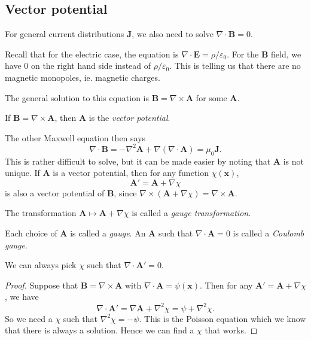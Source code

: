 \documentclass[a4paper]{article}
\begin{document}
\subsection{Vector potential}
For general current distributions $\mathbf{J}$, we also need to solve $\nabla \cdot \mathbf{B} = 0$.

Recall that for the electric case, the equation is $\nabla\cdot \mathbf{E} = \rho/\varepsilon_0$. For the $\mathbf{B}$ field, we have $0$ on the right hand side instead of $\rho/\varepsilon_0$. This is telling us that there are no magnetic monopoles, ie. magnetic charges.

The general solution to this equation is $\mathbf{B} = \nabla \times \mathbf{A}$ for some $\mathbf{A}$.
\begin{defi}
  If $\mathbf{B} = \nabla\times \mathbf{A}$, then $\mathbf{A}$ is the \emph{vector potential}.
\end{defi}
The other Maxwell equation then says
\[
  \nabla \cdot \mathbf{B} = -\nabla^2 \mathbf{A} + \nabla(\nabla\cdot \mathbf{A}) = \mu_0 \mathbf{J}.\tag{$*$}
\]
This is rather difficult to solve, but it can be made easier by noting that $\mathbf{A}$ is not unique. If $\mathbf{A}$ is a vector potential, then for any function $\chi(\mathbf{x})$,
\[
  \mathbf{A}' = \mathbf{A} + \nabla \chi
\]
is also a vector potential of $\mathbf{B}$, since $\nabla \times (\mathbf{A} + \nabla \chi) = \nabla \times \mathbf{A}$.

The transformation $\mathbf{A} \mapsto \mathbf{A} + \nabla\chi$ is called a \emph{gauge transformation}.

\begin{defi}
  Each choice of $\mathbf{A}$ is called a \emph{gauge}. An $\mathbf{A}$ such that $\nabla \cdot \mathbf{A} = 0$ is called a \emph{Coulomb gauge}.
\end{defi}

\begin{prop}
  We can always pick $\chi$ such that $\nabla \cdot \mathbf{A}' = 0$.
\end{prop}

\begin{proof}
  Suppose that $\mathbf{B} = \nabla \times \mathbf{A}$ with $\nabla \cdot \mathbf{A} = \psi(\mathbf{x})$. Then for any $\mathbf{A}' = \mathbf{A} + \nabla \chi$, we have
  \[
    \nabla \cdot \mathbf{A}' = \nabla \mathbf{A} + \nabla^2 \chi = \psi + \nabla^2\chi.
  \]
  So we need a $\chi$ such that $\nabla^2\chi = -\psi$. This is the Poisson equation which we know that there is always a solution. Hence we can find a $\chi$ that works.
\end{proof}
\end{document}
